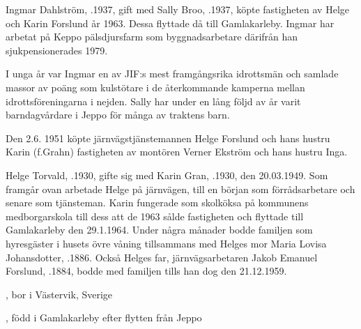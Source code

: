 %
Ingmar Dahlström, .1937, gift med Sally Broo, .1937, köpte fastigheten av Helge och Karin Forslund år 1963. Dessa flyttade då till Gamlakarleby. Ingmar har arbetat  på Keppo pälsdjursfarm som byggnadsarbetare därifrån han sjukpensionerades 1979.

I unga år var Ingmar en av JIF:s mest framgångsrika idrottsmän och samlade massor av poäng som kulstötare i de återkommande kamperna mellan idrottsföreningarna i nejden. Sally har under en lång följd av år varit barndagvårdare i Jeppo för många av traktens barn.
\begin{jhchildren}
  \item {}
  \item {}
  \item {}
  \item {}
  \item {}
\end{jhchildren}


%
Den 2.6. 1951 köpte järnvägstjänstemannen Helge Forslund och hans hustru Karin (f.Grahn) fastigheten av montören Verner Ekström och hans hustru Inga.

Helge Torvald, .1930, gifte sig med Karin Gran, .1930, den 20.03.1949. Som framgår ovan arbetade Helge på järnvägen, till en början som förrådsarbetare och senare som tjänsteman. Karin fungerade som skolköksa på kommunens medborgarskola till dess att de 1963 sålde fastigheten och flyttade till Gamlakarleby den 29.1.1964. Under några månader bodde familjen som hyresgäster i husets övre våning tillsammans med Helges mor Maria Lovisa Johansdotter, .1886. Också Helges far, järnvägsarbetaren Jakob Emanuel Forslund,  .1884, bodde med familjen tills han dog den 21.12.1959.
\begin{jhchildren}
  \item {}, bor i Västervik, Sverige
  \item {}
  \item {}
  \item {}, född i Gamlakarleby efter flytten från Jeppo
\end{jhchildren}


